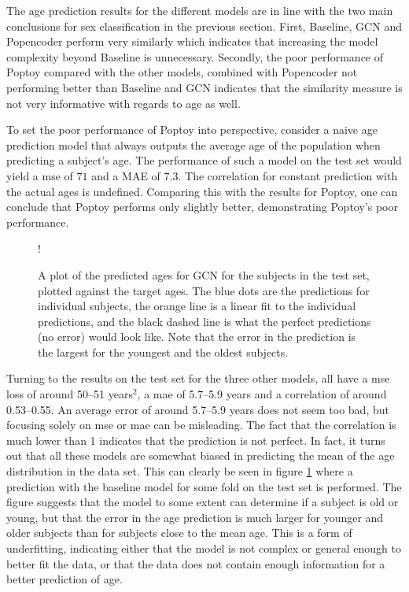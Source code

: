 The age prediction results for the different models are in line with the two main conclusions for sex classification in the previous section. First, Baseline, GCN and Popencoder perform very similarly which indicates that increasing the model complexity beyond Baseline is unnecessary. Secondly, the poor performance of Poptoy compared with the other models, combined with Popencoder not performing better than Baseline and GCN indicates that the similarity measure is not very informative with regards to age as well. 

To set the poor performance of Poptoy into perspective, consider a naive age prediction model that always outputs the average age of the population when predicting a subject's age. The performance of such a model on the test set would yield a \acrshort{mse} of $71$ and a MAE of $7.3$. The correlation for constant prediction with the actual ages is undefined. Comparing this with the results for Poptoy, one can conclude that Poptoy performs only slightly better, demonstrating Poptoy's poor performance.

\begin{figure}[!htbp]
    \centering
    \begin{center}
        \resizebox {0.6\linewidth} {!} {
            
        }
    \end{center}
    \caption{A plot of the predicted ages for GCN for the subjects in the test set, plotted against the target ages. The blue dots are the predictions for individual subjects, the orange line is a linear fit to the individual predictions, and the black dashed line is what the perfect predictions (no error) would look like. Note that the error in the prediction is the largest for the youngest and the oldest subjects.}
    \label{fig:age_regression}
\end{figure}

Turning to the results on the test set for the three other models, all have a \acrshort{mse} loss of around 50--51 years$^2$, a \acrshort{mae} of 5.7--5.9 years and a correlation of around 0.53--0.55. An average error of around 5.7--5.9 years does not seem too bad, but focusing solely on \acrshort{mse} or \acrshort{mae} can be misleading. The fact that the correlation is much lower than 1 indicates that the prediction is not perfect. In fact, it turns out that all these models are somewhat biased in predicting the mean of the age distribution in the data set. This can clearly be seen in figure \cref{fig:age_regression} where a prediction with the baseline model for some fold on the test set is performed. The figure suggests that the model to some extent can determine if a subject is old or young, but that the error in the age prediction is much larger for younger and older subjects than for subjects close to the mean age. This is a form of underfitting, indicating either that the model is not complex or general enough to better fit the data, or that the data does not contain enough information for a better prediction of age.

